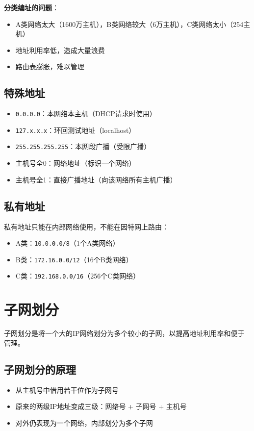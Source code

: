 \documentclass[12pt,a4paper,openany]{ctexbook}
\begin{document}
\textbf{分类编址的问题}：
\begin{itemize}[leftmargin=2em,itemsep=0pt]
    \item A类网络太大（1600万主机），B类网络较大（6万主机），C类网络太小（254主机）
    \item 地址利用率低，造成大量浪费
    \item 路由表膨胀，难以管理
\end{itemize}

\subsection{特殊地址}
\begin{itemize}[leftmargin=2em,itemsep=0pt]
    \item \texttt{0.0.0.0}：本网络本主机（DHCP请求时使用）
    \item \texttt{127.x.x.x}：环回测试地址（localhost）
    \item \texttt{255.255.255.255}：本网段广播（受限广播）
    \item 主机号全0：网络地址（标识一个网络）
    \item 主机号全1：直接广播地址（向该网络所有主机广播）
\end{itemize}

\subsection{私有地址}
私有地址只能在内部网络使用，不能在因特网上路由：
\begin{itemize}[leftmargin=2em,itemsep=0pt]
    \item A类：\texttt{10.0.0.0/8}（1个A类网络）
    \item B类：\texttt{172.16.0.0/12}（16个B类网络）
    \item C类：\texttt{192.168.0.0/16}（256个C类网络）
\end{itemize}

\section{子网划分}
子网划分是将一个大的IP网络划分为多个较小的子网，以提高地址利用率和便于管理。

\subsection{子网划分的原理}
\begin{itemize}[leftmargin=2em,itemsep=0pt]
    \item 从主机号中借用若干位作为子网号
    \item 原来的两级IP地址变成三级：网络号 + 子网号 + 主机号
    \item 对外仍表现为一个网络，内部划分为多个子网
\end{itemize}
\end{document}

